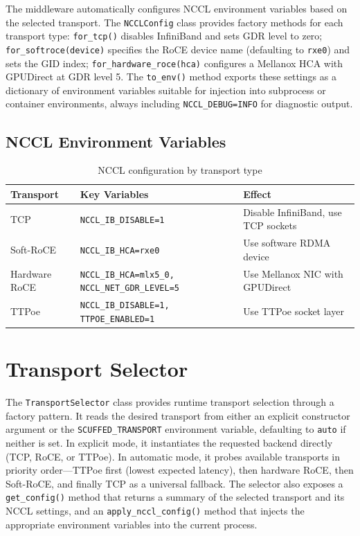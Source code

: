 \documentclass[10pt,letterpaper]{article}
\begin{document}
The middleware automatically configures NCCL environment variables based on the selected transport. The \texttt{NCCLConfig} class provides factory methods for each transport type: \texttt{for\_tcp()} disables InfiniBand and sets GDR level to zero; \texttt{for\_softroce(device)} specifies the RoCE device name (defaulting to \texttt{rxe0}) and sets the GID index; \texttt{for\_hardware\_roce(hca)} configures a Mellanox HCA with GPUDirect at GDR level 5. The \texttt{to\_env()} method exports these settings as a dictionary of environment variables suitable for injection into subprocess or container environments, always including \texttt{NCCL\_DEBUG=INFO} for diagnostic output.

\subsection{NCCL Environment Variables}

\begin{table}[H]
\centering
\small
\begin{tabular}{@{}llp{6cm}@{}}
\toprule
\textbf{Transport} & \textbf{Key Variables} & \textbf{Effect} \\
\midrule
TCP & \texttt{NCCL\_IB\_DISABLE=1} & Disable InfiniBand, use TCP sockets \\
Soft-RoCE & \texttt{NCCL\_IB\_HCA=rxe0} & Use software RDMA device \\
Hardware RoCE & \texttt{NCCL\_IB\_HCA=mlx5\_0, NCCL\_NET\_GDR\_LEVEL=5} & Use Mellanox NIC with GPUDirect \\
TTPoe & \texttt{NCCL\_IB\_DISABLE=1, TTPOE\_ENABLED=1} & Use TTPoe socket layer \\
\bottomrule
\end{tabular}
\caption{NCCL configuration by transport type}
\end{table}

\section{Transport Selector}

The \texttt{TransportSelector} class provides runtime transport selection through a factory pattern. It reads the desired transport from either an explicit constructor argument or the \texttt{SCUFFED\_TRANSPORT} environment variable, defaulting to \texttt{auto} if neither is set. In explicit mode, it instantiates the requested backend directly (TCP, RoCE, or TTPoe). In automatic mode, it probes available transports in priority order---TTPoe first (lowest expected latency), then hardware RoCE, then Soft-RoCE, and finally TCP as a universal fallback. The selector also exposes a \texttt{get\_config()} method that returns a summary of the selected transport and its NCCL settings, and an \texttt{apply\_nccl\_config()} method that injects the appropriate environment variables into the current process.
\end{document}
